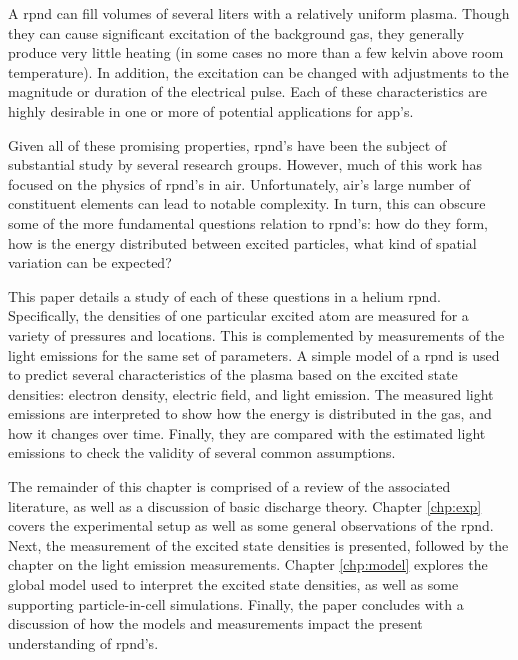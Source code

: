 A \acs{rpnd} can fill volumes of several liters with a relatively uniform
plasma. Though they can cause significant excitation of the background gas, they
generally produce very little heating (in some cases no more than a few kelvin
above room temperature). In addition, the excitation can be changed with
adjustments to the magnitude or duration of the electrical pulse. Each of these
characteristics are highly desirable in one or more of potential applications
for \acs{app}'s.

Given all of these promising properties, \acs{rpnd}'s have been the subject of
substantial study by several research groups. However, much of this work has
focused on the physics of \acs{rpnd}'s in air. Unfortunately, air's large number
of constituent elements can lead to notable complexity. In turn, this can
obscure some of the more fundamental questions relation to \acs{rpnd}'s: how do
they form, how is the energy distributed between excited particles, what kind of
spatial variation can be expected?

This paper details a study of each of these questions in a helium \acs{rpnd}.
Specifically, the densities of one particular excited atom are measured for a
variety of pressures and locations. This is complemented by measurements of the
light emissions for the same set of parameters. A simple model of a \acs{rpnd}
is used to predict several characteristics of the plasma based on the excited
state densities: electron density, electric field, and light emission. The
measured light emissions are interpreted to show how the energy is distributed
in the gas, and how it changes over time. Finally, they are compared with the
estimated light emissions to check the validity of several common assumptions.


The remainder of this chapter is comprised of a review of the associated
literature, as well as a discussion of basic discharge theory. Chapter
\ref{chp:exp} covers the experimental setup as well as some general observations
of the \acs{rpnd}. Next, the measurement of the excited state densities is
presented, followed by the chapter on the light emission measurements. Chapter
\ref{chp:model} explores the global model used to interpret the excited state
densities, as well as some supporting particle-in-cell simulations. Finally, the
paper concludes with a discussion of how the models and measurements impact the
present understanding of \acs{rpnd}'s.

